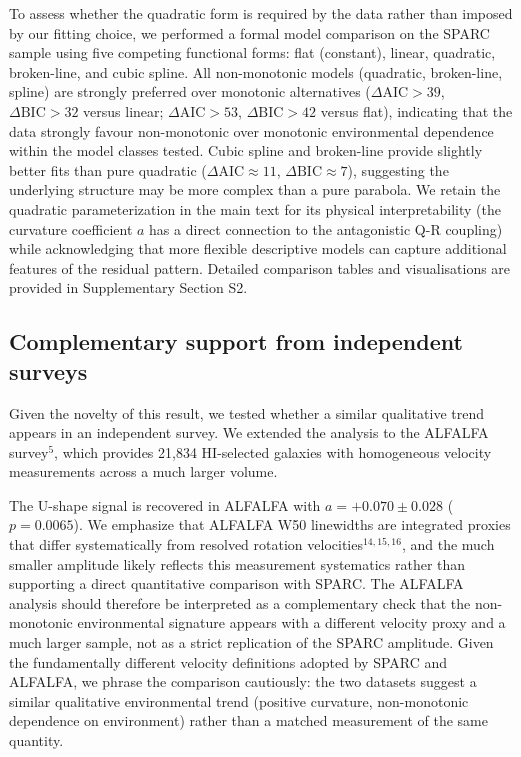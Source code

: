 \documentclass[11pt,a4paper]{article}
\begin{document}
To assess whether the quadratic form is required by the data rather than imposed by our fitting choice, we performed a formal model comparison on the SPARC sample using five competing functional forms: flat (constant), linear, quadratic, broken-line, and cubic spline. All non-monotonic models (quadratic, broken-line, spline) are strongly preferred over monotonic alternatives ($\Delta\mathrm{AIC} > 39$, $\Delta\mathrm{BIC} > 32$ versus linear; $\Delta\mathrm{AIC} > 53$, $\Delta\mathrm{BIC} > 42$ versus flat), indicating that the data strongly favour non-monotonic over monotonic environmental dependence within the model classes tested. Cubic spline and broken-line provide slightly better fits than pure quadratic ($\Delta\mathrm{AIC} \approx 11$, $\Delta\mathrm{BIC} \approx 7$), suggesting the underlying structure may be more complex than a pure parabola. We retain the quadratic parameterization in the main text for its physical interpretability (the curvature coefficient $a$ has a direct connection to the antagonistic Q-R coupling) while acknowledging that more flexible descriptive models can capture additional features of the residual pattern. Detailed comparison tables and visualisations are provided in Supplementary Section S2.

\subsection*{Complementary support from independent surveys}

Given the novelty of this result, we tested whether a similar qualitative trend appears in an independent survey. We extended the analysis to the ALFALFA survey$^{5}$, which provides 21,834 HI-selected galaxies with homogeneous velocity measurements across a much larger volume.

The U-shape signal is recovered in ALFALFA with $a = +0.070 \pm 0.028$ ($p = 0.0065$). We emphasize that ALFALFA W50 linewidths are integrated proxies that differ systematically from resolved rotation velocities$^{14,15,16}$, and the much smaller amplitude likely reflects this measurement systematics rather than supporting a direct quantitative comparison with SPARC. The ALFALFA analysis should therefore be interpreted as a complementary check that the non-monotonic environmental signature appears with a different velocity proxy and a much larger sample, not as a strict replication of the SPARC amplitude. Given the fundamentally different velocity definitions adopted by SPARC and ALFALFA, we phrase the comparison cautiously: the two datasets suggest a similar qualitative environmental trend (positive curvature, non-monotonic dependence on environment) rather than a matched measurement of the same quantity.
\end{document}

